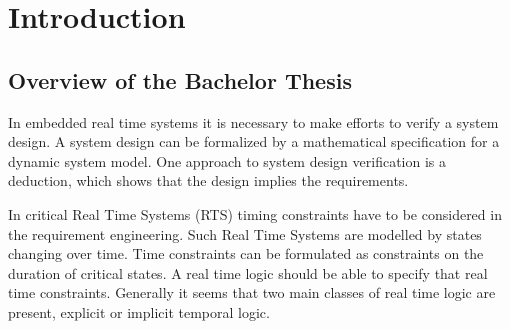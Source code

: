 






\chapter{Introduction}  %

\ifpdf
    \graphicspath{{Chapter1/Figs/Raster/}{Chapter1/Figs/PDF/}{Chapter1/Figs/}}
\else
    \graphicspath{{Chapter1/Figs/Vector/}{Chapter1/Figs/}}
\fi


\section{Overview of the Bachelor Thesis } %

In embedded real time systems it is necessary to make efforts to verify a system design.
A system design can be formalized by a mathematical specification for a dynamic system model.
One approach to system design verification is a deduction, which shows that the design implies the requirements. 

In critical Real Time Systems (RTS) timing constraints have to be considered in the requirement engineering.
Such Real Time Systems are modelled by states changing over time.
Time constraints can be formulated as constraints on the duration of critical states. 
A real time logic should be able to specify that real time constraints. Generally it seems that two main classes
of real time logic are present, explicit or implicit temporal logic.\cite{210306} 

